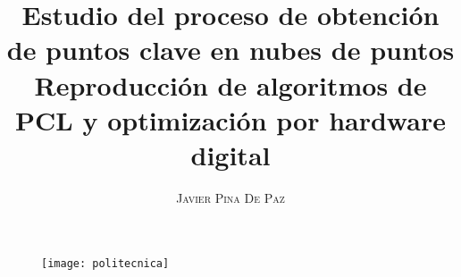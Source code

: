 \documentclass[a4paper,11pt]{book}
\title{\Huge \textbf{Estudio del proceso de obtención de puntos clave en nubes de puntos}   \\ \huge Reproducción de algoritmos de PCL y optimización por hardware digital}
\author{\textsc{Javier Pina De Paz}} %
\begin{document}
\frontmatter
\maketitle

\begin{figure}[!htb]
\centering
\texttt{[image: politecnica]}
\end{figure}

\iffalse
\begin{dedication}
dedicatoria
\end{dedication}
\fi 
\tableofcontents

\mainmatter  %











\end{document}
